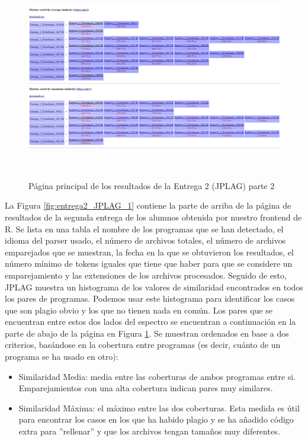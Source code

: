 \begin{figure}[t] %
\centering
\includegraphics[width=14cm, height=9cm]{imagenes/entrega2_JPLAG_2.png}  %
\caption{Página principal de los resultados de la Entrega 2 (JPLAG) parte 2} \label{fig:entrega2_JPLAG_2}
\end{figure}
La Figura \ref{fig:entrega2_JPLAG_1} contiene la parte de arriba de la página de resultados de la segunda entrega de los alumnos obtenida por nuestro frontend de R.
Se lista en una tabla el nombre de los programas que se han detectado, el idioma del parser usado, el número de archivos totales, el número de archivos emparejados que se muestran, la fecha en la que se obtuvieron los resultados, el número mínimo de tokens iguales que tiene que haber para que se considere un emparejamiento y las extensiones de los archivos procesados.
\newline
Seguido de esto, JPLAG muestra un histograma de los valores de similaridad encontrados en todos los pares de programas.
\newline
Podemos usar este histograma para identificar los casos que son plagio obvio y los que no tienen nada en común.
\newline
Los pares que se encuentran entre estos dos lados del espectro se encuentran a continuación en la parte de abajo de la página en Figura \ref{fig:entrega2_JPLAG_2}.
\newline
Se muestran ordenados en base a dos criterios, basándose en la cobertura entre programas (es decir, cuánto de un programa se ha usado en otro):
\begin{itemize}
\item Similaridad Media: media entre las coberturas de ambos programas entre si. Emparejamientos con una alta cobertura indican pares muy similares.
\item Similaridad Máxima: el máximo entre las dos coberturas. Esta medida es útil para encontrar los casos en los que ha habido plagio y se ha añadido código extra para ''rellenar'' y que los archivos tengan tamaños muy diferentes.
\end{itemize}

